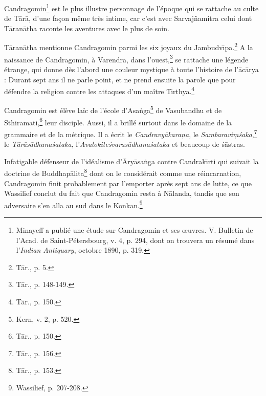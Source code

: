 \documentclass[a4paper, 11pt, oneside, french]{article}
\begin{document}
Candragomin\footnote{Minayeff a publié une étude sur Candragomin et ses œuvres. V. Bulletin de l'Acad. de Saint-Pétersbourg, v. 4, p. 294, dont on trouvera un résumé dans l'\emph{Indian Antiquary}, octobre 1890, p. 319.} est le plus illustre personnage de l'époque qui se rattache au culte de T\={a}r\={a}, d'une façon même très intime, car c'est avec Sarvaj\~{n}amitra celui dont T\={a}ran\={a}tha raconte les aventures avec le plus de soin.

T\={a}ran\={a}tha mentionne Candragomin parmi les six joyaux du Jambudv\={\i}pa.\footnote{T\={a}r., p. 5.} A la naissance de Candragomin, à Varendra, dans l'ouest,\footnote{T\={a}r., p. 148-149.} se rattache une légende étrange, qui donne dès l'abord une couleur mystique à toute l'histoire de l'\={a}c\={a}rya : Durant sept ans il ne parle point, et ne prend ensuite la parole que pour défendre la religion contre les attaques d'un maître T\={\i}rthya.\footnote{T\={a}r., p. 150.}

Candragomin est élève laïc de l'école d'Asa\.{n}ga\footnote{Kern, v. 2, p. 520.} de Vasubandhu et de Sthiramati,\footnote{T\={a}r., p. 150.} leur disciple. Aussi, il a brillé surtout dans le domaine de la grammaire et de la métrique. Il a écrit le \emph{Candravy\={a}kara\d{n}a}, le \emph{Sambaravi\d{m}\'{s}aka},\footnote{T\={a}r., p. 156.} le \emph{T\={a}r\={a}s\={a}dhana\'{s}ataka}, l'\emph{Avalokite\'{s}varas\={a}dhana\'{s}ataka} et beaucoup de \'{s}\={a}stras.

Infatigable défenseur de l'idéalisme d'\={A}ry\={a}sa\.{n}ga contre Candrak\={\i}rti qui suivait la doctrine de Buddhap\={a}lita\footnote{T\={a}r., p. 153.} dont on le considérait comme une réincarnation, Candragomin finit probablement par l'emporter après sept ans de lutte, ce que Wassilief conclut du fait que Candragomin resta à N\={a}landa, tandis que son adversaire s'en alla au sud dans le Konkan.\footnote{Wassilief, p. 207-208.}
\end{document}
